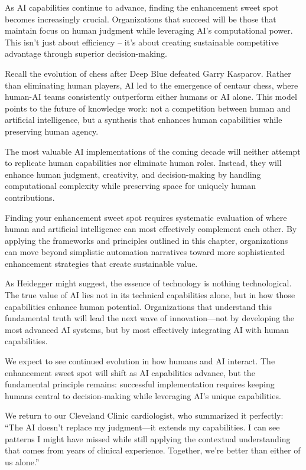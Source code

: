 \documentclass[
  Letterpaper,
]{scrbook}
\begin{document}
As AI capabilities continue to advance, finding the enhancement sweet
spot becomes increasingly crucial. Organizations that succeed will be
those that maintain focus on human judgment while leveraging AI's
computational power. This isn't just about efficiency -- it's about
creating sustainable competitive advantage through superior
decision-making.

Recall the evolution of chess after Deep Blue defeated Garry Kasparov.
Rather than eliminating human players, AI led to the emergence of
centaur chess, where human-AI teams consistently outperform either
humans or AI alone. This model points to the future of knowledge work:
not a competition between human and artificial intelligence, but a
synthesis that enhances human capabilities while preserving human
agency.

The most valuable AI implementations of the coming decade will neither
attempt to replicate human capabilities nor eliminate human roles.
Instead, they will enhance human judgment, creativity, and
decision-making by handling computational complexity while preserving
space for uniquely human contributions.

Finding your enhancement sweet spot requires systematic evaluation of
where human and artificial intelligence can most effectively complement
each other. By applying the frameworks and principles outlined in this
chapter, organizations can move beyond simplistic automation narratives
toward more sophisticated enhancement strategies that create sustainable
value.

As Heidegger might suggest, the essence of technology is nothing
technological. The true value of AI lies not in its technical
capabilities alone, but in how those capabilities enhance human
potential. Organizations that understand this fundamental truth will
lead the next wave of innovation---not by developing the most advanced
AI systems, but by most effectively integrating AI with human
capabilities.

We expect to see continued evolution in how humans and AI interact. The
enhancement sweet spot will shift as AI capabilities advance, but the
fundamental principle remains: successful implementation requires
keeping humans central to decision-making while leveraging AI's unique
capabilities.

We return to our Cleveland Clinic cardiologist, who summarized it
perfectly: ``The AI doesn't replace my judgment---it extends my
capabilities. I can see patterns I might have missed while still
applying the contextual understanding that comes from years of clinical
experience. Together, we're better than either of us alone.''
\end{document}
